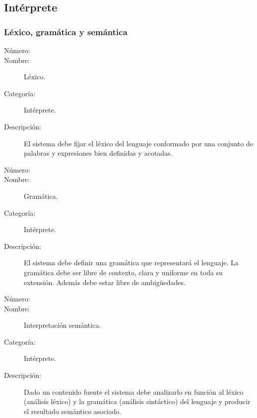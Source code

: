 \subsection{Intérprete}

\subsubsection{Léxico, gramática y semántica}
	\begin{description}
		\item [Número:] \cn
		\item [Nombre:] Léxico.
		\item [Categoría:] Intérprete.
		\item [Descripción:] El sistema debe fijar el léxico del lenguaje conformado por una conjunto de palabras y expresiones bien definidas y acotadas.
	\end{description}

	\begin{description}
		\item [Número:] \cn
		\item [Nombre:] Gramática.
		\item [Categoría:] Intérprete.
		\item [Descripción:] El sistema debe definir una gramática que representará el lenguaje. La gramática debe ser libre de contexto, clara
		y uniforme en toda su extensión. Además debe estar libre de ambigüedades.
	\end{description}

	\begin{description}
		\item [Número:] \cn
		\item [Nombre:] Interpretación semántica.
		\item [Categoría:] Intérprete.
		\item [Descripción:] Dado un contenido fuente el sistema debe analizarlo en función al léxico (análisis léxico) y la gramática (análisis sintáctico)
		del lenguaje y producir el resultado semántico asociado.
	\end {description}


